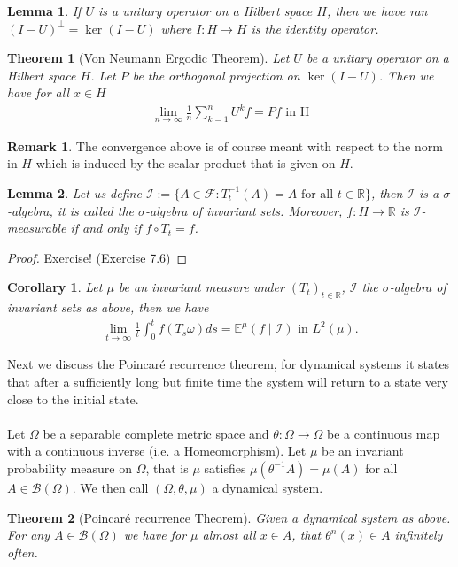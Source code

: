 \documentclass[11pt,a4paper, final]{article}
\newtheorem{lem}{Lemma}[section]
\newtheorem{thm}{Theorem}[section]
\newtheorem{cor}{Corollary}[section]
\theoremstyle{definition}
\newtheorem{rem}{Remark}[section]
\begin{document}
\begin{lem} If $U$ is a unitary operator on a Hilbert space $H$, then we have ran$(I-U)^\perp = \ker(I-U)$ where $I: H \to H$ is the identity operator. 
\end{lem}
\begin{thm}[Von Neumann Ergodic Theorem] Let $U$ be a unitary operator on a Hilbert space $H$. Let $P$ be the orthogonal projection on $\ker(I-U)$. Then we have for all $x \in H$ 
\begin{align*}
\lim_{n \to \infty} \frac{1}{n} \sum_{k=1}^n U^k f = Pf \text{ in H}
\end{align*}
\end{thm}
\begin{rem} The convergence above is of course meant with respect to the norm in $H$ which is induced by the scalar product that is given on $H$. 
\end{rem}
\begin{lem} Let us define $\mathcal{I}:= \lbrace A \in \mathcal{F} : T_t^{-1}(A) = A \text{ for all } t \in \mathbb{R} \rbrace$, then $\mathcal{I}$ is a $\sigma$-algebra, it is called the $\sigma$-algebra of invariant sets. Moreover, $f: H \to \mathbb{R}$ is $\mathcal{I}$-measurable if and only if $f \circ T_t = f$. 
\end{lem}
\begin{proof}
Exercise! (Exercise 7.6)
\end{proof}
\begin{cor} Let $\mu$ be an invariant measure under $(T_t)_{t \in \mathbb{R}}$, $\mathcal{I}$ the $\sigma$-algebra of invariant sets as above, then we have 
\begin{align*}
\lim_{t \to \infty} \frac{1}{t} \int_0^t f (T_s \omega) ds = \mathbb{E}^\mu(f \mid \mathcal{I}) \text{ in } L^2( \mu).
\end{align*}
\end{cor}
\noindent Next we discuss the Poincaré recurrence theorem, for dynamical systems it states that  after a sufficiently long but finite time the system will return to a state very close to the initial state. 
\\\\
Let $\Omega$ be a separable complete metric space and $\theta: \Omega \to \Omega$ be a continuous map with a continuous inverse (i.e. a Homeomorphism). Let $\mu$ be an invariant probability measure on $\Omega$, that is $\mu$ satisfies $\mu( \theta^{-1} A)= \mu(A)$ for all $A \in \mathcal{B}( \Omega)$. We then call $( \Omega, \theta, \mu)$ a dynamical system. 
\begin{thm}[Poincaré recurrence Theorem] Given a dynamical system as above. For any $A \in \mathcal{B}(\Omega)$ we have for $\mu$ almost all $x \in A$, that $\theta^n(x) \in A$ infinitely often. 

\end{thm}
\end{document}
